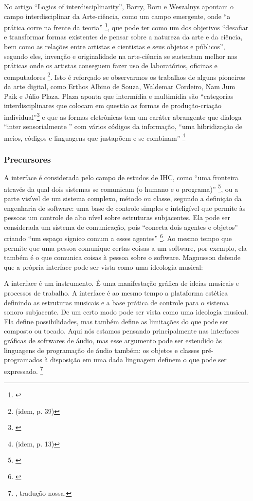 No artigo ``Logics of interdisciplinarity'', Barry, Born e Weszalnys apontam o campo interdisciplinar da Arte-ciência, como um campo emergente, onde ``a prática corre na frente da teoria'' \footnote{\cite{Barry2008}}, que pode ter como um dos objetivos ``desafiar e transformar formas existentes de pensar sobre a natureza da arte e da ciência, bem como as relações entre artistas e cientistas e seus objetos e públicos'', segundo eles, invenção e originalidade na arte-ciência se sustentam melhor nas práticas onde os artistas conseguem fazer uso de laboratórios, oficinas e computadores \footnote{(idem, p. 39)}. Isto é reforçado se observarmos os trabalhos de alguns pioneiros da arte digital, como Erthos Albino de Souza, Waldemar Cordeiro, Nam Jum Paik e Júlio Plaza. 
Plaza aponta que intermídia e multimídia são ``categorias interdisciplinares  que colocam em questão as formas de produção-criação individual''\footnote{\cite[66]{JulioPlaza1969}} e que as formas eletrônicas tem um caráter abrangente que dialoga ``inter sensorialmente '' com vários códigos da informação, ``uma hibridização de meios, códigos e linguagens que justapõem e se combinam'' \footnote{(idem, p. 13)}




\subsubsection{Precursores}
A interface é considerada pelo campo de estudos de IHC, como “uma fronteira através da qual dois sistemas se comunicam (o humano e o programa)” \footnote{\cite{Magnusson2005}}, ou a parte visível de um sistema complexo, método ou classe, segundo a definição da engenharia de software: uma base de controle simples e inteligível que permite às pessoas um controle de alto nível sobre estruturas subjacentes. Ela pode ser considerada um sistema de comunicação, pois “conecta dois agentes e objetos” criando “um espaço sígnico comum a esses agentes” \footnote{\cite[105]{IAZZETTA1997}}. Ao mesmo tempo que permite que uma pessoa comunique certas coisas a um software, por exemplo, ela também é o que comunica coisas à pessoa sobre o software. Magnusson \citeyear{Magnusson2005} defende que a própria interface pode ser vista como uma ideologia musical: 

\begin{citacao}
A interface é um instrumento. É uma manifestação gráfica de ideias musicais e processos de trabalho. A interface é ao mesmo tempo a plataforma estética definindo as estruturas musicais e a base prática de controle para o sistema sonoro subjacente. De um certo modo pode ser vista como uma ideologia musical. Ela define possibilidades, mas também define as limitações do que pode ser composto ou tocado. Aqui nós estamos pensando principalmente nas interfaces gráficas de softwares de áudio, mas esse argumento pode ser estendido às linguagens de programação de áudio também: os objetos e classes pré-programados à disposição em uma dada linguagem definem o que pode ser expressado. \footnote{\cite[212]{Magnusson2005}, tradução nossa.}
\end{citacao}

